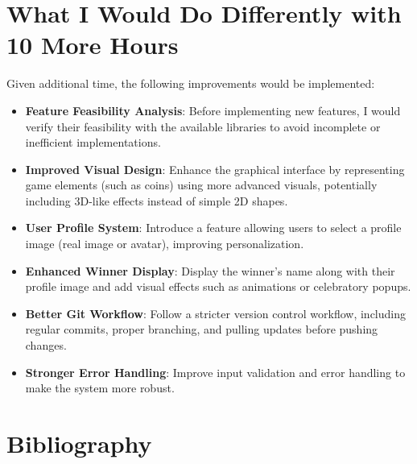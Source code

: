 \documentclass{article}
\begin{document}
\section{What I Would Do Differently with 10 More Hours}

Given additional time, the following improvements would be implemented:

\begin{itemize}

\item \textbf{Feature Feasibility Analysis}: Before implementing new features, I would verify their feasibility with the available libraries to avoid incomplete or inefficient implementations.

\item \textbf{Improved Visual Design}: Enhance the graphical interface by representing game elements (such as coins) using more advanced visuals, potentially including 3D-like effects instead of simple 2D shapes.

\item \textbf{User Profile System}: Introduce a feature allowing users to select a profile image (real image or avatar), improving personalization.

\item \textbf{Enhanced Winner Display}: Display the winner’s name along with their profile image and add visual effects such as animations or celebratory popups.

\item \textbf{Better Git Workflow}: Follow a stricter version control workflow, including regular commits, proper branching, and pulling updates before pushing changes.

\item \textbf{Stronger Error Handling}: Improve input validation and error handling to make the system more robust.

\end{itemize}
\nocite{*}
\section{Bibliography}


\end{document}
